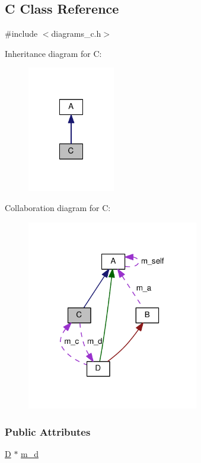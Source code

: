 \hypertarget{class_c}{}\subsection{C Class Reference}
\label{class_c}


{\ttfamily \#include $<$diagrams\+\_\+c.\+h$>$}



Inheritance diagram for C\+:
\nopagebreak
\begin{figure}[H]
\begin{center}
\leavevmode
\includegraphics[width=108pt]{class_c__inherit__graph}
\end{center}
\end{figure}


Collaboration diagram for C\+:
\nopagebreak
\begin{figure}[H]
\begin{center}
\leavevmode
\includegraphics[width=212pt]{class_c__coll__graph}
\end{center}
\end{figure}
\subsubsection*{Public Attributes}
\begin{DoxyCompactItemize}
\item 
\hyperlink{class_d}{D} $\ast$ \hyperlink{class_c_a4ef972d28b73ff78eba3ab4f54c3b449}{m\+\_\+d}
\end{DoxyCompactItemize}


